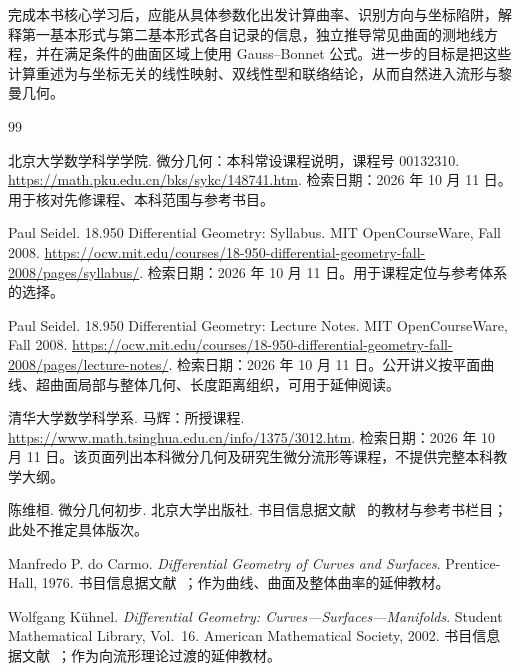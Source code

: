 \documentclass[UTF8,12pt,a4paper,fontset=fandol]{ctexbook}
\begin{document}
完成本书核心学习后，应能从具体参数化出发计算曲率、识别方向与坐标陷阱，解释第一基本形式与第二基本形式各自记录的信息，独立推导常见曲面的测地线方程，并在满足条件的曲面区域上使用 Gauss--Bonnet 公式。进一步的目标是把这些计算重述为与坐标无关的线性映射、双线性型和联络结论，从而自然进入流形与黎曼几何。

\backmatter
\begin{thebibliography}{99}

北京大学数学科学学院. 微分几何：本科常设课程说明，课程号 00132310.
\url{https://math.pku.edu.cn/bks/sykc/148741.htm}.
检索日期：2026 年 10 月 11 日。用于核对先修课程、本科范围与参考书目。

Paul Seidel. 18.950 Differential Geometry: Syllabus. MIT OpenCourseWare, Fall 2008.
\url{https://ocw.mit.edu/courses/18-950-differential-geometry-fall-2008/pages/syllabus/}.
检索日期：2026 年 10 月 11 日。用于课程定位与参考体系的选择。

Paul Seidel. 18.950 Differential Geometry: Lecture Notes. MIT OpenCourseWare, Fall 2008.
\url{https://ocw.mit.edu/courses/18-950-differential-geometry-fall-2008/pages/lecture-notes/}.
检索日期：2026 年 10 月 11 日。公开讲义按平面曲线、超曲面局部与整体几何、长度距离组织，可用于延伸阅读。

清华大学数学科学系. 马辉：所授课程.
\url{https://www.math.tsinghua.edu.cn/info/1375/3012.htm}.
检索日期：2026 年 10 月 11 日。该页面列出本科微分几何及研究生微分流形等课程，不提供完整本科教学大纲。

陈维桓. 微分几何初步. 北京大学出版社.
书目信息据文献~\cite{pku-course} 的教材与参考书栏目；此处不推定具体版次。

Manfredo P. do Carmo. \textit{Differential Geometry of Curves and Surfaces}.
Prentice-Hall, 1976.
书目信息据文献~\cite{mit-syllabus}；作为曲线、曲面及整体曲率的延伸教材。

Wolfgang K\"uhnel. \textit{Differential Geometry: Curves---Surfaces---Manifolds}.
Student Mathematical Library, Vol.~16. American Mathematical Society, 2002.
书目信息据文献~\cite{mit-syllabus}；作为向流形理论过渡的延伸教材。

\end{thebibliography}
\end{document}
